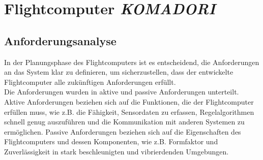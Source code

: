 

\chapter{Flightcomputer \textit{KOMADORI}}
\label{ch:komadori}


\section{Anforderungsanalyse}
\label{sec:anforderungsanalyse}
In der Planungsphase des Flightcomputers ist es entscheidend, die Anforderungen an das System klar zu definieren, um sicherzustellen, dass der entwickelte Flightcomputer alle zukünftigen Anforderungen erfüllt. 
\\
Die Anforderungen wurden in aktive und passive Anforderungen unterteilt. Aktive Anforderungen beziehen sich auf die Funktionen, die der Flightcomputer erfüllen muss, wie z.B. die Fähigkeit, Sensordaten zu erfassen, Regelalgorithmen schnell genug auszuführen und die Kommunikation mit anderen Systemen zu ermöglichen. Passive Anforderungen beziehen sich auf die Eigenschaften des Flightcomputers und dessen Komponenten, wie z.B. Formfaktor und Zuverlässigkeit in stark beschleunigten und vibrierdenden Umgebungen.
\\

